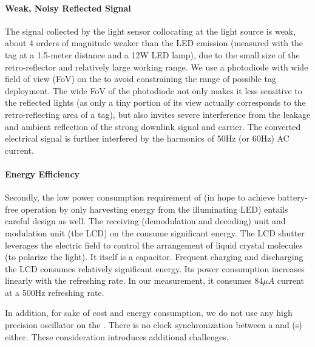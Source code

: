 \paragraph{Weak, Noisy Reflected Signal} 
The signal collected by the light sensor collocating at the light source is weak,  about $4$ orders of magnitude weaker than the LED emission (measured with the tag at a 1.5-meter distance and a 12W LED lamp), due to the small size of the retro-reflector and relatively large working range. 
We use a photodiode with wide field of view (FoV) on the \reader to avoid constraining the range of possible tag deployment. The wide FoV of the photodiode not only makes it less sensitive to the reflected lights (as only a tiny portion of its view actually corresponds to the retro-reflecting area of a tag), but also invites severe interference from the leakage and ambient reflection of the strong downlink signal and carrier. The converted electrical signal is further interfered by the harmonics of 50Hz (or 60Hz) AC current. 

\paragraph{Energy Efficiency} 
Secondly, the low power consumption requirement of \vitag (in hope to achieve battery-free operation by only harvesting energy from the illuminating LED) entails careful design as well. 
The receiving (demodulation and decoding) unit and modulation unit (the LCD) on the \vitag consume significant energy. The LCD shutter leverages the electric field to control the arrangement of liquid crystal molecules (to polarize the light). It itself is a capacitor. 
Frequent charging and discharging the LCD consumes relatively significant energy.
Its power consumption increases linearly with the refreshing rate. In our measurement, it consumes $84\mu A$ current at a 500Hz refreshing rate.

In addition, for sake of cost and energy consumption, we do not use any high precision oscillator on the \vitag. There is no clock synchronization between a \reader and \vitag(s) either. These consideration introduces additional challenges. 





